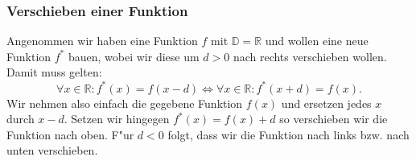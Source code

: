 \subsubsection{Verschieben einer Funktion} \label{sec:verschieben}
Angenommen wir haben eine Funktion $f$ mit $\mathbb{D} = \mathbb{R}$ und wollen eine neue Funktion $f^*$ bauen, wobei wir diese um $d > 0$ nach rechts verschieben wollen. Damit muss gelten:
\begin{equation*}
\forall x \in \mathbb{R} :  f^*(x) = f(x-d) \iff \forall x \in \mathbb{R} : f^*(x+d) = f(x).
\end{equation*}
Wir nehmen also einfach die gegebene Funktion $f(x)$ und ersetzen jedes $x$ durch $x-d$. Setzen wir hingegen $f^*(x) = f(x) + d$ so verschieben wir die Funktion nach oben. F"ur $d < 0$ folgt, dass wir die Funktion nach links bzw. nach unten verschieben.